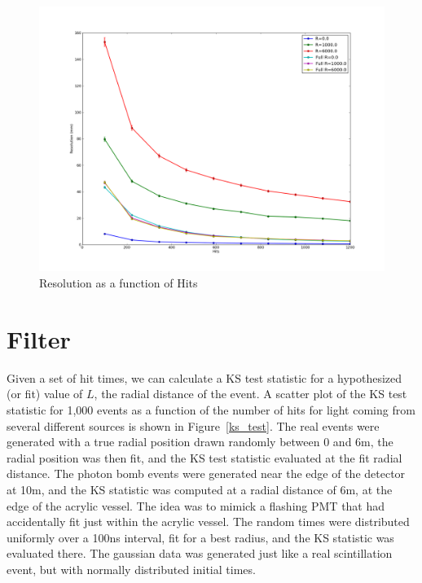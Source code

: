 \documentclass{article}
\begin{document}
\begin{figure}[h!]
    \centering
    \includegraphics[width=1.0\linewidth]{../scint_res.png}
    \caption{Resolution as a function of Hits}
    \label{scint_res}
\end{figure}

\newpage
\section{Filter}
Given a set of hit times, we can calculate a KS test statistic for a
hypothesized (or fit) value of $L$, the radial distance of the event. A scatter
plot of the KS test statistic for 1,000 events as a function of the number of
hits for light coming from several different sources is shown in
Figure~\ref{ks_test}. The real events were generated with a true radial
position drawn randomly between 0 and 6m, the radial position was then fit, and
the KS test statistic evaluated at the fit radial distance. The photon bomb
events were generated near the edge of the detector at 10m, and the KS
statistic was computed at a radial distance of 6m, at the edge of the acrylic
vessel. The idea was to mimick a flashing PMT that had accidentally fit just
within the acrylic vessel. The random times were distributed uniformly over a
100ns interval, fit for a best radius, and the KS statistic was evaluated
there. The gaussian data was generated just like a real scintillation event,
but with normally distributed initial times.
\end{document}
